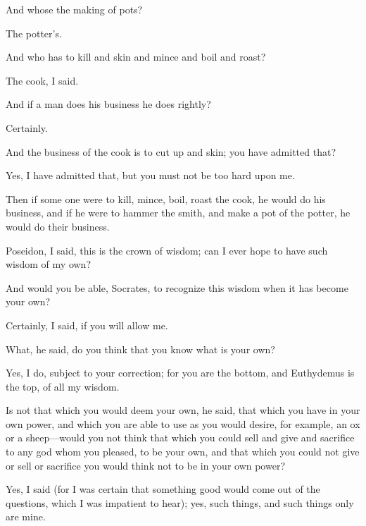 \documentclass[11pt,letter]{article}
\begin{document}
\par  And whose the making of pots?

\par  The potter's.

\par  And who has to kill and skin and mince and boil and roast?

\par  The cook, I said.

\par  And if a man does his business he does rightly?

\par  Certainly.

\par  And the business of the cook is to cut up and skin; you have admitted that?

\par  Yes, I have admitted that, but you must not be too hard upon me.

\par  Then if some one were to kill, mince, boil, roast the cook, he would do his business, and if he were to hammer the smith, and make a pot of the potter, he would do their business.

\par  Poseidon, I said, this is the crown of wisdom; can I ever hope to have such wisdom of my own?

\par  And would you be able, Socrates, to recognize this wisdom when it has become your own?

\par  Certainly, I said, if you will allow me.

\par  What, he said, do you think that you know what is your own?

\par  Yes, I do, subject to your correction; for you are the bottom, and Euthydemus is the top, of all my wisdom.

\par  Is not that which you would deem your own, he said, that which you have in your own power, and which you are able to use as you would desire, for example, an ox or a sheep—would you not think that which you could sell and give and sacrifice to any god whom you pleased, to be your own, and that which you could not give or sell or sacrifice you would think not to be in your own power?

\par  Yes, I said (for I was certain that something good would come out of the questions, which I was impatient to hear); yes, such things, and such things only are mine.
\end{document}
